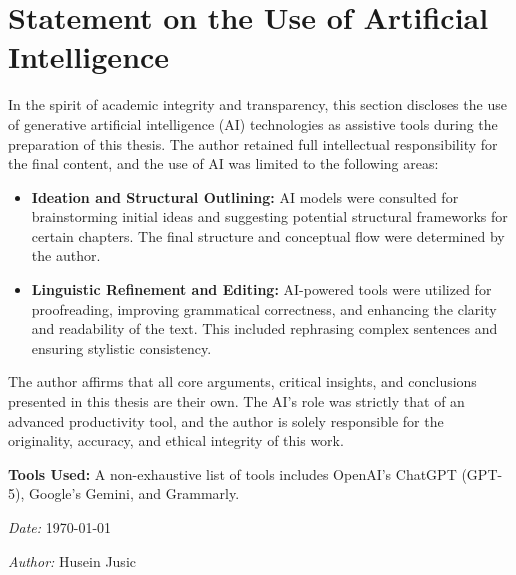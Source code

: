 \chapter*{Statement on the Use of Artificial Intelligence}
In the spirit of academic integrity and transparency, this section discloses the use of generative artificial intelligence (AI) technologies as assistive tools during the preparation of this thesis. The author retained full intellectual responsibility for the final content, and the use of AI was limited to the following areas:

\begin{itemize}
    \item \textbf{Ideation and Structural Outlining:} AI models were consulted for brainstorming initial ideas and suggesting potential structural frameworks for certain chapters. The final structure and conceptual flow were determined by the author.

    \item \textbf{Linguistic Refinement and Editing:} AI-powered tools were utilized for proofreading, improving grammatical correctness, and enhancing the clarity and readability of the text. This included rephrasing complex sentences and ensuring stylistic consistency.
\end{itemize}

\noindent
The author affirms that all core arguments, critical insights, and conclusions presented in this thesis are their own. The AI's role was strictly that of an advanced productivity tool, and the author is solely responsible for the originality, accuracy, and ethical integrity of this work.

\bigskip
\noindent
\textbf{Tools Used:} A non-exhaustive list of tools includes OpenAI's ChatGPT (GPT-5), Google's Gemini, and Grammarly.

\bigskip
\noindent
\textit{Date:} \today

\noindent
\textit{Author:} Husein Jusic